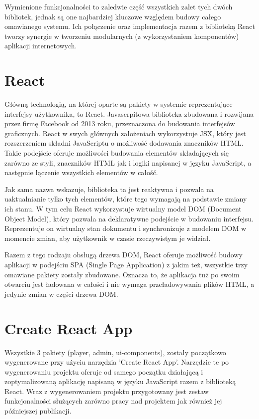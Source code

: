 Wymienione funkcjonalności to zaledwie część wszystkich zalet tych dwóch bibliotek, jednak są one najbardziej kluczowe względem budowy całego omawianego systemu. Ich połączenie oraz implementacja razem z biblioteką React tworzy synergie w tworzeniu modularnych (z wykorzystaniem komponentów) aplikacji internetowych. 

\label{ch:frontend:react}
\section{React}
Główną technologią, na której oparte są pakiety w systemie reprezentujące interfejsy użytkownika, to React. Javascrpitowa biblioteka zbudowana i rozwijana przez firmę Facebook od 2013 roku, przeznaczona do budowania interfejsów graficznych. React w swych głównych założeniach wykorzystuje JSX, który jest rozszerzeniem składni JavaScriptu o możliwość dodawania znaczników HTML. Takie podejście oferuje możliwości budowania elementów składających się zarówno ze styli, znaczników HTML jak i logiki napisanej w języku JavaScript, a następnie łączenie wszystkich elementów w całość.

Jak sama nazwa wskazuje, biblioteka ta jest reaktywna i pozwala na uaktualnianie tylko tych elementów, które tego wymagają na podstawie zmiany ich stanu. W tym celu React wykorzystuje wirtualny model DOM (Document Object Model), który pozwala na deklaratywne podejście w budowaniu interfejsu. Reprezentuje on wirtualny stan dokumentu i synchronizuje z modelem DOM w momencie zmian, aby użytkownik w czasie rzeczywistym je widział.

Razem z tego rodzaju obsługą drzewa DOM, React oferuje możliwość budowy aplikacji w podejściu SPA (Single Page Application) z jakim też, wszystkie trzy omawiane pakiety zostały zbudowane. Oznacza to, że aplikacja tuż po swoim otwarciu jest ładowana w całości i nie wymaga przeładowywania plików HTML, a jedynie zmian w części drzewa DOM.

\section{Create React App}
Wszystkie 3 pakiety (player, admin, ui-components), zostały początkowo wygenerowane przy użyciu narzędzia 'Create React App'. Narzędzie te po wygenerowaniu projektu oferuje od samego początku działającą i zoptymalizowaną aplikację napisaną w języku JavaScript razem z biblioteką React. Wraz z wygenerowaniem projektu przygotowany jest zestaw funkcjonalności służących zarówno pracy nad projektem jak również jej późniejszej publikacji.

